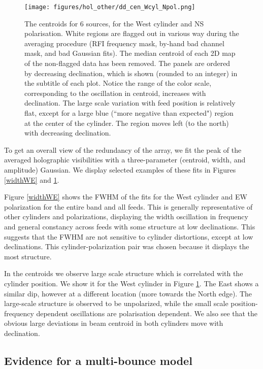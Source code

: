 \begin{figure}[h!]
\begin{center}
\texttt{[image: figures/hol\_other/dd\_cen\_Wcyl\_Npol.png]}
\caption{The centroids for 6 sources, for the West cylinder and NS polarisation. White regions are flagged out in various way during the averaging procedure (RFI frequency mask, by-hand bad channel mask, and bad Gaussian fits). The median centroid of each 2D map of the non-flagged data has been removed. The panels are ordered by decreasing declination, which is shown (rounded to an integer) in the subtitle of each plot. Notice the range of the color scale, corresponding to the oscillation in centroid, increases with declination. The large scale variation with feed position is relatively flat, except for a large blue (``more negative than expected") region at the center of the cylinder. The region moves left (to the north) with decreasing declination.}
\label{cenWN}
\end{center}
\end{figure}

To get an overall view of the redundancy of the array, we fit the peak of the averaged holographic visibilities with a three-parameter (centroid, width, and amplitude) Gaussian. We display selected examples of these fits in Figures \ref{widthWE} and \ref{cenWN}. 

Figure \ref{widthWE} shows the FWHM of the fits for the West cylinder and EW polarization for the entire band and all feeds. This is generally representative of other cylinders and polarizations, displaying the width oscillation in frequency and general constancy across feeds with some structure at low declinations. This suggests that the FWHM are not sensitive to cylinder distortions, except at low declinations. This cylinder-polarization pair was chosen because it displays the most structure.

In the centroids we observe large scale structure which is correlated with the cylinder position. We show it for the West cylinder in Figure \ref{cenWN}. The East shows a similar dip, however at a different location (more towards the North edge). The large-scale structure is observed to be unpolarized, while the small scale position-frequency dependent oscillations are polarisation dependent. We also see that the obvious large deviations in beam centroid in both cylinders move with declination.

\subsection{Evidence for a multi-bounce model} \label{ch:hol:ss:multibounce}


